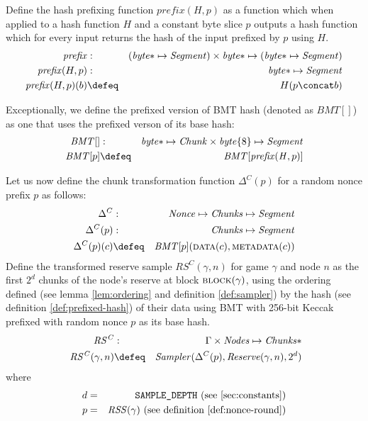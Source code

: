 \begin{definition}
\label{def:prefixed-hash}
Define the hash prefixing function $\mathit{prefix}(H,p)$ as a function which when applied to a hash function $\mathit{H}$ and a constant byte slice $p$  outputs a hash function which for every input returns the hash of the input prefixed by $p$ using $H$.
%
\begin{eqnarray}
\mathit{prefix}&: &(\mathit{byte}{*}\mapsto\mathit{Segment})\times\mathit{byte}{*}\mapsto (\mathit{byte}{*}\mapsto\mathit{Segment})
\\
\mathit{prefix}(H,p) &: &\mathit{byte}{*}\mapsto\mathit{Segment}\\
\mathit{prefix}(H,p)(b) &\defeq & H(p\concat b)
\end{eqnarray}

Exceptionally, we define the prefixed version of BMT hash (denoted as $\mathit{BMT}[]$) as one   that uses the prefixed verson of its base hash:
%   
\begin{eqnarray}
\mathit{BMT}[]&: &\mathit{byte}{*}\mapsto\mathit{Chunk}\times\mathit{byte}\{8\}\mapsto\mathit{Segment}\\
\mathit{BMT}[p]&\defeq&\mathit{BMT}[\mathit{prefix}(\mathit{H},p)]
\end{eqnarray}

\end{definition}
    
\begin{definition}
\label{def:transformed-reserve}
%
Let us now define the chunk transformation function $\Delta^C(p)$
for a random nonce prefix $p$ as follows: 
%
\begin{eqnarray}
\Delta^C&:&\mathit{Nonce}\mapsto\mathit{Chunks}\mapsto\mathit{Segment}\\
\Delta^C(p)&:&\mathit{Chunks}\mapsto\mathit{Segment}\\
\Delta^C(p)(c)&\defeq&\mathit{BMT}[p](\textsc{data}(c),\textsc{metadata}(c))
\end{eqnarray}
%
Define the transformed reserve sample $\mathit{RS^C}(\gamma,n)$ for game $\gamma$ and node $n$ as the first  $2^d$ chunks of the node's reserve at block $\textsc{block}(\gamma)$, using the ordering defined (see lemma \ref{lem:ordering} and definition \ref{def:sampler}) by the hash (see definition \ref{def:prefixed-hash}) of their data  using BMT with 256-bit Keccak prefixed with random nonce $p$ as its base hash.
%
\begin{eqnarray}
\mathit{RS^C}&:&\Gamma\times\mathit{Nodes}\mapsto\mathit{Chunks}{*}\\\
\mathit{RS^C}(\gamma,n)&\defeq&\mathit{Sampler}(\Delta^C(p),\mathit{Reserve}(\gamma,n),2^d)
\end{eqnarray}
where 
\begin{eqnarray}
d & = & \texttt{SAMPLE\_DEPTH} \text{ (see \ref{sec:constants})} \\
p & = & \mathit{RSS}(\gamma) \text{ (see definition \ref{def:nonce-round})}
\end{eqnarray}
\end{definition}


